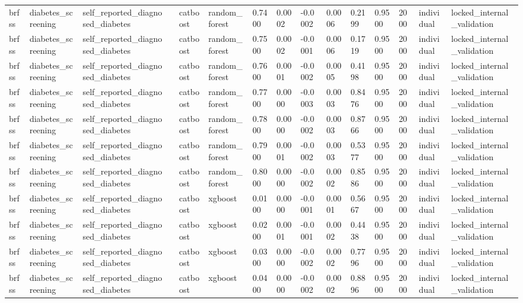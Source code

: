 \begin{tabular}{lllllllllllllll}
brfss & diabetes\_screening & self\_reported\_diagnosed\_diabetes &  & catboost & random\_forest & 0.7400 & 0.0002 & -0.0002 & 0.0006 & 0.2199 & 0.9500 & 2000 & individual & locked\_internal\_validation \\
brfss & diabetes\_screening & self\_reported\_diagnosed\_diabetes &  & catboost & random\_forest & 0.7500 & 0.0002 & -0.0001 & 0.0006 & 0.1719 & 0.9500 & 2000 & individual & locked\_internal\_validation \\
brfss & diabetes\_screening & self\_reported\_diagnosed\_diabetes &  & catboost & random\_forest & 0.7600 & 0.0001 & -0.0002 & 0.0005 & 0.4198 & 0.9500 & 2000 & individual & locked\_internal\_validation \\
brfss & diabetes\_screening & self\_reported\_diagnosed\_diabetes &  & catboost & random\_forest & 0.7700 & 0.0000 & -0.0003 & 0.0003 & 0.8476 & 0.9500 & 2000 & individual & locked\_internal\_validation \\
brfss & diabetes\_screening & self\_reported\_diagnosed\_diabetes &  & catboost & random\_forest & 0.7800 & 0.0000 & -0.0002 & 0.0003 & 0.8766 & 0.9500 & 2000 & individual & locked\_internal\_validation \\
brfss & diabetes\_screening & self\_reported\_diagnosed\_diabetes &  & catboost & random\_forest & 0.7900 & 0.0001 & -0.0002 & 0.0003 & 0.5377 & 0.9500 & 2000 & individual & locked\_internal\_validation \\
brfss & diabetes\_screening & self\_reported\_diagnosed\_diabetes &  & catboost & random\_forest & 0.8000 & 0.0000 & -0.0002 & 0.0002 & 0.8586 & 0.9500 & 2000 & individual & locked\_internal\_validation \\
brfss & diabetes\_screening & self\_reported\_diagnosed\_diabetes &  & catboost & xgboost & 0.0100 & 0.0000 & -0.0001 & 0.0001 & 0.5667 & 0.9500 & 2000 & individual & locked\_internal\_validation \\
brfss & diabetes\_screening & self\_reported\_diagnosed\_diabetes &  & catboost & xgboost & 0.0200 & 0.0001 & -0.0001 & 0.0002 & 0.4438 & 0.9500 & 2000 & individual & locked\_internal\_validation \\
brfss & diabetes\_screening & self\_reported\_diagnosed\_diabetes &  & catboost & xgboost & 0.0300 & 0.0000 & -0.0002 & 0.0002 & 0.7796 & 0.9500 & 2000 & individual & locked\_internal\_validation \\
brfss & diabetes\_screening & self\_reported\_diagnosed\_diabetes &  & catboost & xgboost & 0.0400 & 0.0000 & -0.0002 & 0.0002 & 0.8896 & 0.9500 & 2000 & individual & locked\_internal\_validation \\

\end{tabular}
